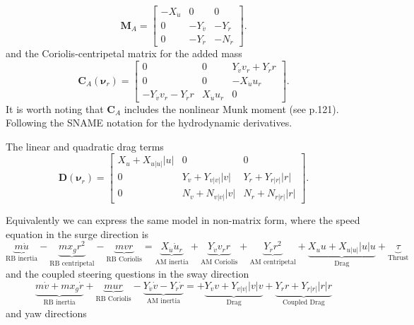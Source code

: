 \documentclass[11pt,draftcls,journal,onecolumn]{IEEEtran}
\begin{document}
\begin{equation}
\bm{M}_{A}= \left[ 
\begin{array}{ccc}
-X_{\dot{u}} & 0 & 0 \\
0 & -Y_{\dot{v}} & -Y_{\dot{r}} \\
0 & -Y_{\dot{r}} & -N_{\dot{r}} 
\end{array} \right].
\end{equation}
and the Coriolis-centripetal matrix for the added mass
\begin{equation}
\bm{C}_{A}(\bm{\nu}_r)= \left[ 
\begin{array}{ccc}
0 & 0 & Y_{\dot{v}}v_r+Y_{\dot{r}}r \\
0 & 0 & -X_{\dot{u}}u_r\\
 -Y_{\dot{v}}v_r - Y_{\dot{r}}r& X_{\dot{u}}u_r & 0 
\end{array} \right].
\end{equation}
It is worth noting that $\bm{C}_A$ includes the nonlinear Munk moment (see \cite{fossen11handbook} p.121).  Following \cite{fossen11handbook} the SNAME notation for the hydrodynamic derivatives.

The linear and quadratic drag terms
\begin{equation}
\bm{D}(\bm{\nu}_r)= \left[ 
\begin{array}{ccc}
X_u + X_{u|u|}|u| & 0 & 0 \\
0 & Y_v + Y_{v|v|}|v| & Y_r+Y_{r|r|}|r|\\
0 & N_v + N_{v|v|}|v| & N_r+N_{r|r|}|r|
\end{array} \right].
\end{equation}

Equivalently we can express the same model in non-matrix form, where the speed equation in the surge direction is 
\begin{equation}
\underbrace{m \dot{u}}_\text{RB inertia}  
- \underbrace{m x_g r^2}_\text{RB centripetal}
- \underbrace{mvr}_\text{RB Coriolis}
=
\underbrace{X_{\dot{u}} \dot{u}_r}_\text{AM inertia}
+ \underbrace{Y_{\dot{v}}v_r r}_\text{AM Coriolis}
+ \underbrace{Y_{\dot{r}}r^2}_\text{AM centripetal}
+ \underbrace{X_u u + X_{u|u|}|u|u}_\text{Drag} 
+ \underbrace{\tau}_\text{Thrust}
\label{e:fullu}
\end{equation}
and the coupled steering questions in the sway direction 
\begin{equation}
\underbrace{m \dot{v} + m x_g \dot{r}}_\text{RB inertia}  
+ \underbrace{m ur}_\text{RB Coriolis}
- \underbrace{Y_{\dot{v}}\dot{v} - Y_{\dot{r}}\dot{r}}_\text{AM inertia}
=
+ \underbrace{Y_v v + Y_{v|v|}|v|v}_\text{Drag} 
+ \underbrace{Y_r r + Y_{r|r|}|r|r}_\text{Coupled Drag} 
\label{e:fullv}
\end{equation}
and yaw directions 
\end{document}
